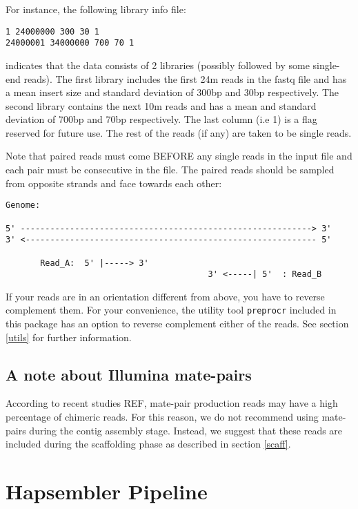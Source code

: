 \documentclass[12pt,a4paper]{report}
\begin{document}
For instance, the following library info file:

\begin{verbatim}
1 24000000 300 30 1
24000001 34000000 700 70 1
\end{verbatim}

indicates that the data consists of 2 libraries (possibly followed by some single-end reads). The first library includes the first 24m reads in the fastq file and has a mean insert size and standard deviation of 300bp and 30bp respectively. The second library contains the next 10m reads and has a mean and standard deviation of 700bp and 70bp respectively. The last column (i.e 1) is a flag reserved for future use. The rest of the reads (if any) are taken to be single reads. 

Note that paired reads must come BEFORE any single reads in the input file and each pair must be consecutive in the file. The paired reads should be sampled from opposite strands and face towards each other:

\begin{verbatim}
Genome:

5' -----------------------------------------------------------> 3'
3' <----------------------------------------------------------- 5'

       Read_A:  5' |-----> 3'
                                         3' <-----| 5'  : Read_B
\end{verbatim}

If your reads are in an orientation different from above, you have to reverse complement them. For your convenience, the utility tool \texttt{preprocr} included in this package has an option to reverse complement either of the reads. See section \ref{utils} for further information.

\subsection{A note about Illumina mate-pairs}

According to recent studies REF, mate-pair production reads may have a high percentage of chimeric reads. For this reason, we do not recommend using mate-pairs during the contig assembly stage. Instead, we suggest that these reads are included during the scaffolding phase as described in section \ref{scaff}. 

\section{Hapsembler Pipeline}
\end{document}
